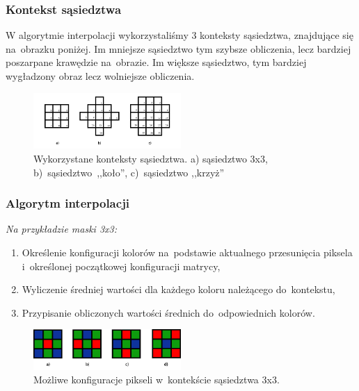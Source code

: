 \documentclass{beamer}
\begin{document}
\begin{frame}
	\frametitle{Kontekst sąsiedztwa}
	
	W algorytmie interpolacji wykorzystaliśmy 3 konteksty sąsiedztwa, znajdujące się na~obrazku poniżej. Im mniejsze sąsiedztwo tym szybsze obliczenia, lecz bardziej poszarpane krawędzie na~obrazie. Im większe sąsiedztwo, tym bardziej wygładzony obraz lecz wolniejsze obliczenia.
	
  \begin{figure}
  \includegraphics[width=0.5\textwidth]{masks}
  \caption{Wykorzystane konteksty sąsiedztwa. a) sąsiedztwo 3x3, b)~sąsiedztwo~,,koło'',
  c)~sąsiedztwo ,,krzyż''}
  \label{fig:masks}
  \end{figure}
\end{frame}

\begin{frame}
  \frametitle{Algorytm interpolacji}
  \emph{Na przykładzie maski 3x3:}
  
  \begin{enumerate}
    \item Określenie konfiguracji kolorów na~podstawie aktualnego przesunięcia piksela i~określonej
      początkowej konfiguracji matrycy,
    \item Wyliczenie średniej wartości dla każdego koloru należącego do~kontekstu,
    \item Przypisanie obliczonych wartości średnich do~odpowiednich kolorów.
  \end{enumerate}
  
  \begin{figure}
  \includegraphics[width=0.5\textwidth]{mask3conf}
  \caption{Możliwe konfiguracje pikseli w~kontekście sąsiedztwa 3x3.}
  \label{fig:masks}
  \end{figure}
  
\end{frame}
\end{document}
